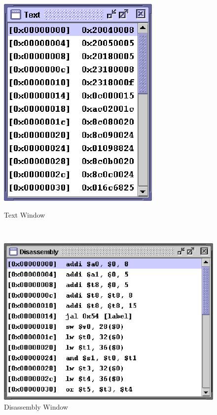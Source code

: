 
\begin{center}
\begin{figure}[H]	
	\begin{center}
	\begin{minipage}[H]{2.4in}
		\begin{center}
			\includegraphics{graphics/TextWindow.eps}
		\end{center}
		
		\caption{\label{fig:Text} Text Window}
		
	\end{minipage}
	\ 
	\begin{minipage}[H]{2.7in}
		\begin{center}
			\includegraphics{graphics/DisassemblyWindow.eps}
		\end{center}
		\caption{\label{fig:Disassembly}Disassembly Window}
	\end{minipage}	
	\end{center}
\end{figure}
\end{center}


